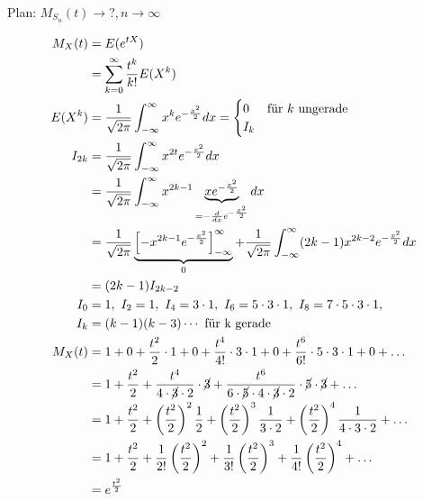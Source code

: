 \documentclass[10pt,a4paper]{scrartcl}
\begin{document}
Plan: $M_{S_n}(t) \longrightarrow ?, n\rightarrow \infty$

\begin{align*}
    M_X(t) &= E(e^{tX}) \\
           &= \sum_{k=0}^\infty \frac{t^k}{k!} E(X^k) \\
    E(X^k) &= \frac{1}{\sqrt{2\pi}} \int_{-\infty}^\infty x^k e^{-\frac{x^2}{2}} dx = \begin{cases} 0 & \text{für } k \text{ ungerade} \\ I_k \end{cases} \\
    I_{2k} &= \frac{1}{\sqrt{2\pi}} \int_{-\infty}^\infty x^{2t} e^{-\frac{x^2}{2}} dx \\
           &= \frac{1}{\sqrt{2\pi}} \int_{-\infty}^\infty x^{2k-1} \underbrace{xe^{-\frac{x^2}{2}}}_{= -\frac{d}{dx} e^{-\frac{x^2}{2}}} dx \\
           &= \frac{1}{\sqrt{2\pi}} \underbrace{\left[ -x^{2k-1} e^{-\frac{x^2}{2}} \right]_{-\infty}^\infty}_0 + 
               \frac{1}{\sqrt{2\pi}} \int_{-\infty}^\infty (2k-1)x^{2k-2} e^{-\frac{x^2}{2}} dx\\
           &= (2k-1)I_{2k-2} \\
       I_0 &= 1,\  I_2 = 1,\  I_4 = 3\cdot 1,\  I_6 = 5\cdot 3\cdot 1,\  I_8 = 7\cdot 5\cdot 3\cdot 1,\\
       I_k &= (k-1)(k-3)\cdots \text{ für k gerade} \\
    M_X(t) &= 1 + 0 + \frac{t^2}{2} \cdot 1 + 0 + \frac{t^4}{4!} \cdot 3 \cdot 1 + 0 + \frac{t^6}{6!}\cdot 5 \cdot 3 \cdot 1 + 0 + \dots \\
           &= 1 + \frac{t^2}{2} + \frac{t^4}{4\cdot \cancel{3}\cdot2} \cdot \cancel{3} + 
               \frac{t^6}{6\cdot\cancel{5}\cdot4\cdot \cancel{3}\cdot2}\cdot \cancel{5} \cdot \cancel{3} + \dots \\
           &= 1 + \frac{t^2}{2} + \left(\frac{t^2}{2}\right)^2 \frac{1}{2} + \left(\frac{t^2}{2}\right)^3 \frac{1}{3\cdot2} + 
               \left(\frac{t^2}{2}\right)^4 \frac{1}{4\cdot3\cdot2} + \dots \\
           &= 1 + \frac{t^2}{2} + \frac{1}{2!} \left(\frac{t^2}{2}\right)^2 + \frac{1}{3!} \left(\frac{t^2}{2}\right)^3 + 
               \frac{1}{4!} \left(\frac{t^2}{2}\right)^4 + \dots \\
           &= e^{\frac{t^2}{2}}
\end{align*}
\end{document}
